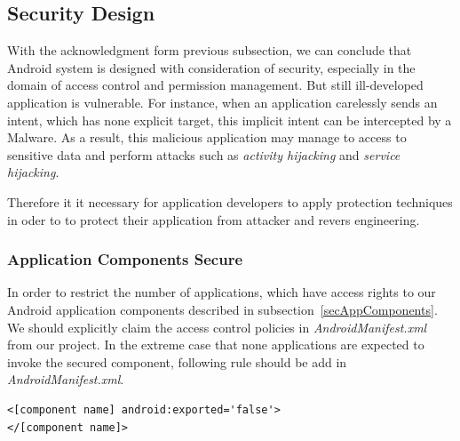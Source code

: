 \subsection{Security Design}
With the acknowledgment form previous subsection, we can conclude that Android system is designed with consideration of security, especially in the domain of access control and permission management. But still ill-developed application is vulnerable. For instance, when an application carelessly sends an intent, which has none explicit target, this implicit intent can be intercepted by a Malware. As a result, this malicious application may manage to access to sensitive data and perform attacks such as \emph{activity hijacking} and \emph{service hijacking}\cite{android_secure_inter}.

Therefore it it necessary for application developers to apply protection techniques  in oder to to protect their application from attacker and revers engineering. 
\subsubsection{Application Components Secure}
In order to restrict the number of applications, which have access rights to our Android application components described in subsection~\ref{secAppComponents}. We should explicitly claim the access control policies in \emph{AndroidManifest.xml} from our project. In the extreme case that none applications are expected to invoke the secured component, following rule should be add in \emph{AndroidManifest.xml}\cite{android_secure_cook}.
\begin{verbatim}
<[component name] android:exported='false'>
</[component name]>
\end{verbatim} 
